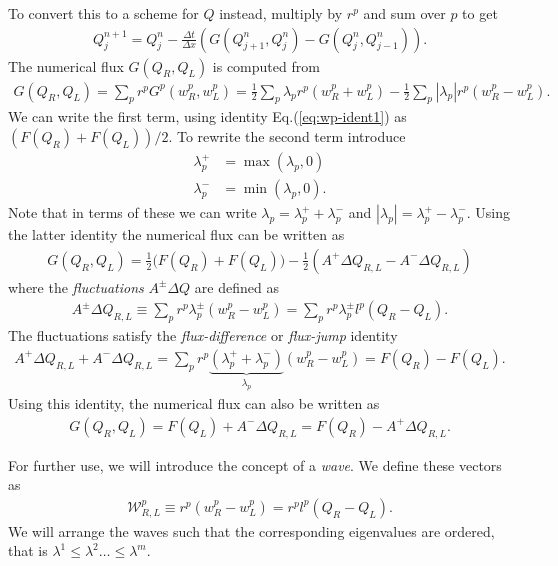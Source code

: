\documentclass[12pt]{article}
\theoremstyle{definition}
\theoremstyle{definition}
\theoremstyle{definition}
\newcommand{\eqr}[1]{Eq.\thinspace(#1)}
\begin{document}
To convert this to a scheme for $Q$ instead, multiply by $r^p$ and sum
over $p$ to get
\begin{align}
Q^{n+1}_j = Q^n_j - \frac{\Delta t}{\Delta x}\left(G(Q^n_{j+1},Q^n_{j}) - G(Q^n_{j},Q^n_{j-1})\right).
\end{align}
The numerical flux $G(Q_R,Q_L)$ is computed from
\begin{align}
G(Q_R,Q_L) = \sum_p r^p G^p(w_R^p,w_L^p) = \frac{1}{2} \sum_p \lambda_p r^p (w_R^p+w_L^p) 
- \frac{1}{2} \sum_p |\lambda_p| r^p (w_R^p-w_L^p).
\end{align}
We can write the first term, using identity \eqr{\ref{eq:wp-ident1}}
as $(F(Q_R)+F(Q_L))/2$. To rewrite the second term introduce
\begin{align}
\lambda_p^+ &= \max(\lambda_p,0) \\
\lambda_p^- &= \min(\lambda_p,0).
\end{align}
Note that in terms of these we can write
$\lambda_p = \lambda_p^+ + \lambda_p^-$ and
$|\lambda_p| = \lambda_p^+ - \lambda_p^-$. Using the latter identity
the numerical flux can be written as
\begin{align}
G(Q_R,Q_L) = \frac{1}{2}\big(F(Q_R)+F(Q_L)\big) - \frac{1}{2}(A^+\Delta Q_{R,L} - A^-\Delta Q_{R,L})
\label{eq:num-flux-1}
\end{align}
where the \emph{fluctuations} $A^\pm\Delta Q$ are defined as
\begin{align}
A^\pm\Delta Q_{R,L} \equiv \sum_p r^p \lambda^\pm_p (w_R^p-w_L^p) = \sum_p r^p \lambda^\pm_p l^p(Q_R-Q_L). \label{eq:fluct}
\end{align}
The fluctuations satisfy the \emph{flux-difference} or
\emph{flux-jump} identity
\begin{align}
A^+\Delta Q_{R,L} + A^-\Delta Q_{R,L} = 
\sum_p r^p \underbrace{(\lambda_p^+ + \lambda_p^-)}_{\lambda_p}
(w^p_R-w^p_L) = F(Q_R)-F(Q_L). \label{eq:flux-jump}
\end{align}
Using this identity, the numerical flux can also be written as
\begin{align}
G(Q_R,Q_L) = F(Q_L) + A^-\Delta Q_{R,L} = F(Q_R) - A^+\Delta Q_{R,L}.
\label{eq:num-flux-2}
\end{align}

For further use, we will introduce the concept of a \emph{wave}. We
define these vectors as
\begin{align}
  \mathcal{W}_{R,L}^p \equiv r^p (w_R^p-w_L^p) =  r^p  l^p(Q_R-Q_L) .
\end{align}
We will arrange the waves such that the corresponding eigenvalues are
ordered, that is $\lambda^1 \le \lambda^2 \ldots \le \lambda^m$.
\end{document}
